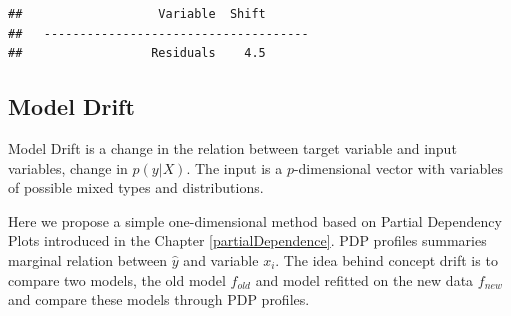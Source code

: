 \documentclass[12pt,]{krantz}
\newenvironment{Shaded}{\begin{snugshade}}{\end{snugshade}}
\newcommand{\ControlFlowTok}[1]{\textcolor[rgb]{0.13,0.29,0.53}{\textbf{#1}}}
\newcommand{\DataTypeTok}[1]{\textcolor[rgb]{0.13,0.29,0.53}{#1}}
\newcommand{\DecValTok}[1]{\textcolor[rgb]{0.00,0.00,0.81}{#1}}
\newcommand{\KeywordTok}[1]{\textcolor[rgb]{0.13,0.29,0.53}{\textbf{#1}}}
\newcommand{\NormalTok}[1]{#1}
\newcommand{\OperatorTok}[1]{\textcolor[rgb]{0.81,0.36,0.00}{\textbf{#1}}}
\newcommand{\StringTok}[1]{\textcolor[rgb]{0.31,0.60,0.02}{#1}}
\begin{document}
\begin{Shaded}
\end{Shaded}

\begin{verbatim}
##                   Variable  Shift
##   -------------------------------------
##                  Residuals    4.5
\end{verbatim}

\hypertarget{model-drift}{%
\subsection{Model Drift}\label{model-drift}}

Model Drift is a change in the relation between target variable and input variables, change in \(p(y|X)\). The input is a \(p\)-dimensional vector with variables of possible mixed types and distributions.

Here we propose a simple one-dimensional method based on Partial Dependency Plots introduced in the Chapter \ref{partialDependence}. PDP profiles summaries marginal relation between \(\hat y\) and variable \(x_i\). The idea behind concept drift is to compare two models, the old model \(f_{old}\) and model refitted on the new data \(f_{new}\) and compare these models through PDP profiles.
\end{document}
